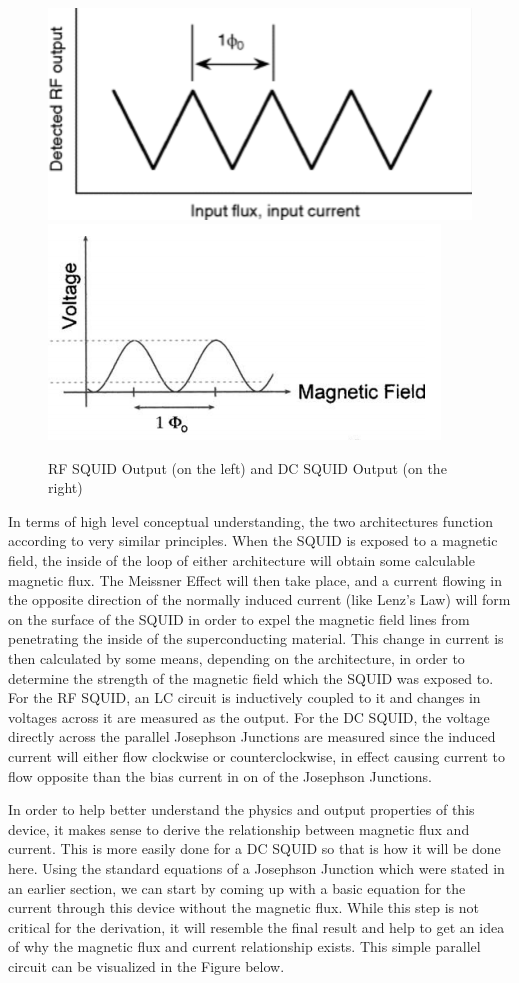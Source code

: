 \documentclass[conf]{new-aiaa}
\begin{document}
\begin{figure}[!h]
    \centering
    \includegraphics[width = .4\linewidth]{RF.PNG}
    \includegraphics[width = .4\linewidth]{DC.PNG}
    \caption{RF SQUID Output (on the left) and DC SQUID Output (on the right)}
\end{figure}

In terms of high level conceptual understanding, the two architectures function according to very similar principles. When the SQUID is exposed to a magnetic field, the inside of the loop of either architecture will obtain some calculable magnetic flux. The Meissner Effect will then take place, and a current flowing in the opposite direction of the normally induced current (like Lenz's Law) will form on the surface of the SQUID in order to expel the magnetic field lines from penetrating the inside of the superconducting material. This change in current is then calculated by some means, depending on the architecture, in order to determine the strength of the magnetic field which the SQUID was exposed to. For the RF SQUID, an LC circuit is inductively coupled to it and changes in voltages across it are measured as the output. For the DC SQUID, the voltage directly across the parallel Josephson Junctions are measured since the induced current will either flow clockwise or counterclockwise, in effect causing current to flow opposite than the bias current in on of the Josephson Junctions. 

In order to help better understand the physics and output properties of this device, it makes sense to derive the relationship between magnetic flux and current. This is more easily done for a DC SQUID so that is how it will be done here. Using the standard equations of a Josephson Junction which were stated in an earlier section, we can start by coming up with a basic equation for the current through this device without the magnetic flux. While this step is not critical for the derivation, it will resemble the final result and help to get an idea of why the magnetic flux and current relationship exists. This simple parallel circuit can be visualized in the Figure below. 
\end{document}
